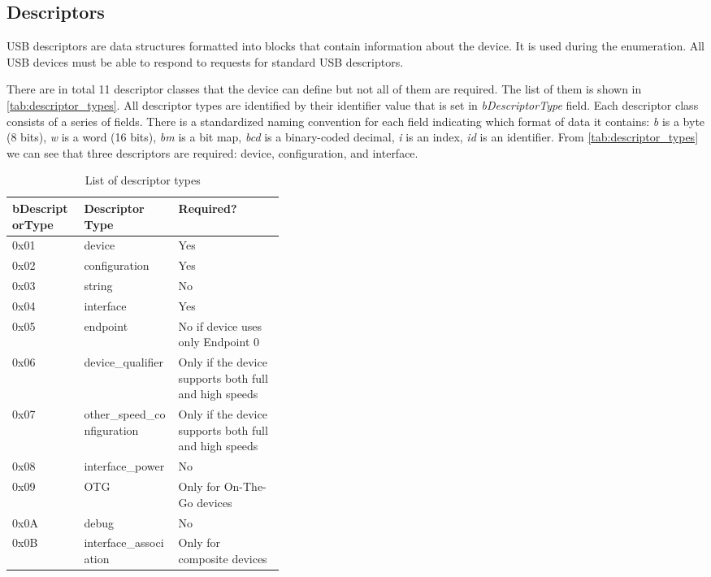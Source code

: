 \subsection*{Descriptors}
\label{descriptor}
USB descriptors are data structures formatted into blocks that contain information about the device. It is used during the enumeration. All USB devices must be able to respond to requests for standard USB descriptors.

There are in total 11 descriptor classes that the device can define but not all of them are required. The list of them is shown in \autoref{tab:descriptor_types}. All descriptor types are identified by their identifier value that is set in \emph{bDescriptorType} field. Each descriptor class consists of a series of fields. There is a standardized naming convention for each field indicating which format of data it contains: \emph{b} is a byte (8 bits), \emph{w} is a word (16 bits), \emph{bm} is a bit map, \emph{bcd} is a binary-coded decimal, \emph{i} is an index, \emph{id} is an identifier. From \autoref{tab:descriptor_types} we can see that three descriptors are required: device, configuration, and interface.

\begin{table}[ht]
    \centering
    \begin{tabular}{|l|l|p{0.39\linewidth}|} \hline
         \textbf{bDescriptorType} & \textbf{Descriptor Type} & \textbf{Required?} \\ \hline
         0x01 & device                      & Yes \\ \hline
         0x02 & configuration               & Yes \\ \hline
         0x03 & string                      & No  \\ \hline
         0x04 & interface                   & Yes \\ \hline
         0x05 & endpoint                    & No if device uses only Endpoint 0 \\ \hline
         0x06 & device\_qualifier           & Only if the device supports both full and high speeds \\ \hline
         0x07 & other\_speed\_configuration & Only if the device supports both full and high speeds \\ \hline
         0x08 & interface\_power            & No \\ \hline
         0x09 & OTG                         & Only for On-The-Go devices \\ \hline
         0x0A & debug                       & No \\ \hline
         0x0B & interface\_association      & Only for composite devices \\ \hline
         \end{tabular}
    \caption{List of descriptor types}
    \label{tab:descriptor_types}
\end{table}

